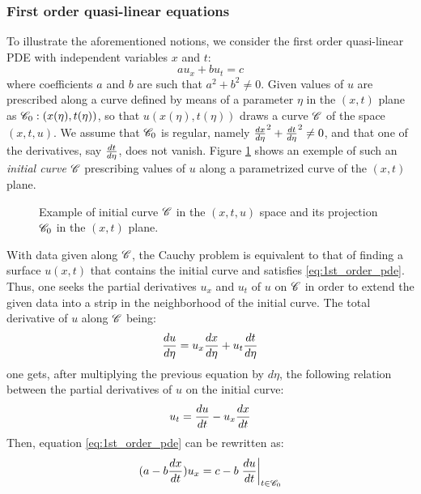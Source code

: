 \subsubsection*{First order quasi-linear equations}
To illustrate the aforementioned notions, we consider the first order quasi-linear PDE with independent variables $x$ and $t$:
\begin{equation}
  \label{eq:1st_order_pde}
   a u_x + b u_t  = c
\end{equation}
where coefficients $a$ and $b$ are such that $a^2 + b^2 \neq 0$. Given values of $u$ are prescribed along a curve defined by means of a parameter $\eta$ in the $(x,t)$ plane as $\mathscr{C}_0:(x(\eta),t(\eta))$, so that $u(x(\eta),t(\eta))$ draws a curve $\mathscr{C}$ of the space $(x,t,u)$. 
We assume that $\mathscr{C}_0$ is regular, namely $\frac{d x}{d \eta}^2 + \frac{d t}{d \eta}^2 \neq 0$, and that one of the derivatives, say $\frac{d t}{d \eta}$, does not vanish. Figure \ref{fig:initial_curve} shows an exemple of such an \textit{initial curve} $\mathscr{C}$ prescribing values of $u$ along a parametrized curve of the $(x,t)$ plane.
\begin{figure}[h]
  \centering
  
  \caption{Example of initial curve $\mathscr{C}$ in the $(x,t,u)$ space and its projection $\mathscr{C}_0$ in the $(x,t)$ plane.}
  \label{fig:initial_curve}
\end{figure}
With data given along $\mathscr{C}$, the Cauchy problem is equivalent to that of finding a surface $u(x,t)$ that contains the initial curve and satisfies \eqref{eq:1st_order_pde}.
Thus, one seeks the partial derivatives $u_x$ and $u_t$ of $u$ on $\mathscr{C}$ in order to extend the given data into a strip in the neighborhood of the initial curve.
The total derivative of $u$ along $\mathscr{C}$ being:
\begin{equation}
  \label{eq:dtot_u}
  \frac{d u}{d \eta}=u_x\frac{d x}{d \eta}+u_t\frac{d t}{d \eta}
\end{equation}
one gets, after multiplying the previous equation by $d\eta$, the following relation between the partial derivatives of $u$ on the initial curve:
\begin{equation*}
  u_t= \frac{d u}{d t} - u_x\frac{d x}{d t}
\end{equation*}
Then, equation \eqref{eq:1st_order_pde} can be rewritten as:
\begin{equation}
  \label{eq:normal_form_pde}
  (a - b\frac{d x}{d t})u_x = c - b\left.\frac{d u}{d t}\right|_{t\in\mathscr{C}_0}
\end{equation}
